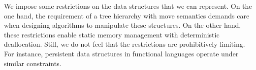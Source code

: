 \documentclass{sig-alternate}
\newcommand{\CEU}{\textsc{C\'{e}u}\xspace}
\newcommand{\code}[1] {{\small{\texttt{#1}}}}
\begin{document}

We impose some restrictions on the data structures that we can represent.
On the one hand, the requirement of a tree hierarchy with move semantics 
demands care when designing algorithms to manipulate these structures.
On the other hand, these restrictions enable static memory management with
deterministic deallocation.
Still, we do not feel that the restrictions are prohibitively limiting.
For instance, persistent data structures in functional languages operate under 
similar constraints.

\balance



\balancecolumns
\end{document}

